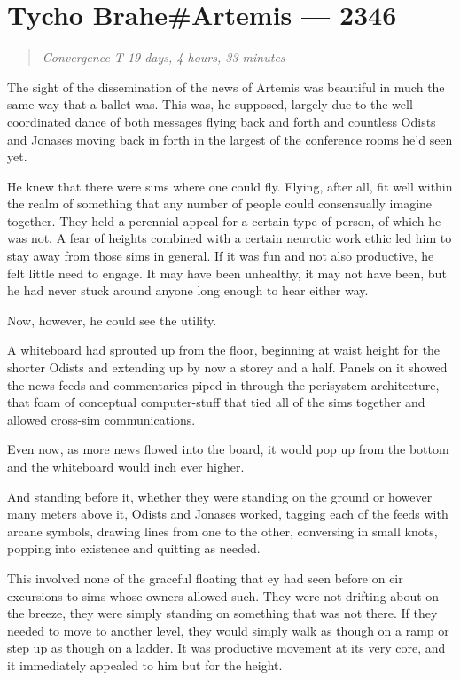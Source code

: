 \hypertarget{tycho-braheartemis-2346}{%
\chapter{Tycho Brahe\#Artemis — 2346}\label{tycho-braheartemis-2346}}

\begin{quote}
\emph{Convergence T-19 days, 4 hours, 33 minutes}
\end{quote}

The sight of the dissemination of the news of Artemis was beautiful in much the same way that a ballet was. This was, he supposed, largely due to the well-coordinated dance of both messages flying back and forth and countless Odists and Jonases moving back in forth in the largest of the conference rooms he'd seen yet.

He knew that there were sims where one could fly. Flying, after all, fit well within the realm of something that any number of people could consensually imagine together. They held a perennial appeal for a certain type of person, of which he was not. A fear of heights combined with a certain neurotic work ethic led him to stay away from those sims in general. If it was fun and not also productive, he felt little need to engage. It may have been unhealthy, it may not have been, but he had never stuck around anyone long enough to hear either way.

Now, however, he could see the utility.

A whiteboard had sprouted up from the floor, beginning at waist height for the shorter Odists and extending up by now a storey and a half. Panels on it showed the news feeds and commentaries piped in through the perisystem architecture, that foam of conceptual computer-stuff that tied all of the sims together and allowed cross-sim communications.

Even now, as more news flowed into the board, it would pop up from the bottom and the whiteboard would inch ever higher.

And standing before it, whether they were standing on the ground or however many meters above it, Odists and Jonases worked, tagging each of the feeds with arcane symbols, drawing lines from one to the other, conversing in small knots, popping into existence and quitting as needed.

This involved none of the graceful floating that ey had seen before on eir excursions to sims whose owners allowed such. They were not drifting about on the breeze, they were simply standing on something that was not there. If they needed to move to another level, they would simply walk as though on a ramp or step up as though on a ladder. It was productive movement at its very core, and it immediately appealed to him but for the height.

